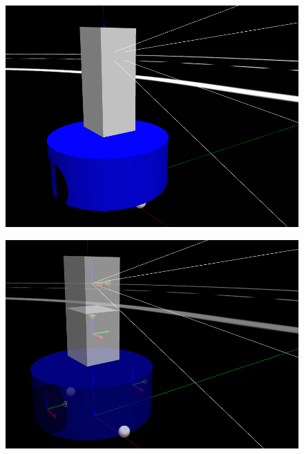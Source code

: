\documentclass[conference]{IEEEtran}
\begin{document}
\begin{figure}[h]
\begin{minipage}{.45\linewidth}
  \includegraphics[width=\linewidth]{alphabot2-gazebo.png}
  \label{fig:alphabot2-gazebo}
\end{minipage}\quad
\begin{minipage}{.45\linewidth}
  \centering
  \includegraphics[width=\linewidth]{alphabot2_joints.png}
  \label{fig:alphabot2_joints}
\end{minipage}
\end{figure}
\end{document}

